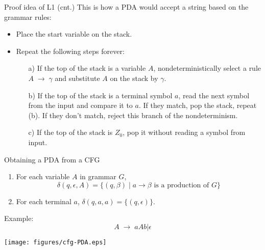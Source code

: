 \documentclass{prosper}%
\newcommand{\ra}{\mbox{$\;\rightarrow\;$}}
\begin{document}
\begin{comment}
\item The PDA's nondeterminism will come in handy, as it allows it to guess the sequence of correct substitutions.
\item $P$'s design sketch: $P$ will push on the stack left-sentential forms of $G$; and it will go through these sentential forms, making one substitution after another. Eventually it {\blue may} arrive at a configuration (a string) that contains only terminals. Then $P$ accepts if this string matches $w$.
\end{itemize}
\end{slide}
\end{comment}

\begin{slide}{Proof idea of L1 (cnt.)}
This is how a PDA would accept a string based on the grammar rules:
\begin{itemize}
\item Place the start variable on the stack.
\item Repeat the following steps forever:
\begin{enumerate}
\item[a)] If the top of the stack is a variable $A$, nondeterministically select a rule $A \ra \gamma$ and substitute $A$ on the stack by $\gamma$.
\item[b)] If the top of the stack is a terminal symbol $a$, read the next symbol from the input and compare it to $a$. If they match, pop the stack, repeat (b). If they don't match, reject this branch of the nondeterminism.
\item[c)] If the top of the stack is $Z_0$, pop it without reading a symbol from input.
\end{enumerate}
\end{itemize}
\end{slide}

\begin{slide}{Obtaining a PDA from a CFG}
\begin{enumerate}
\item For each variable $A$ in grammar $G$,
\[
\delta(q, \epsilon, A)=\{(q, \beta)\;|\;a\rightarrow \beta\mbox{ is a production of $G$}\}
\]
\item For each terminal $a$, $\delta(q, a, a)=\{(q, \epsilon)\}$.
\end{enumerate}
\begin{minipage}{6cm}
Example: 
\[
A\ra aAb | \epsilon
\]
\end{minipage}
\begin{minipage}{5cm}
\begin{center}
\texttt{[image: figures/cfg-PDA.eps]}
\end{center}
\end{minipage}
\end{slide}
\end{document}
